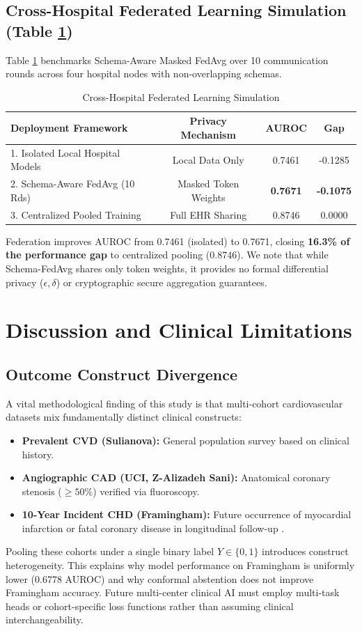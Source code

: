 \documentclass[journal]{IEEEtran}
\begin{document}
\subsection{Cross-Hospital Federated Learning Simulation (Table \ref{tab:federated_learning})}
Table \ref{tab:federated_learning} benchmarks Schema-Aware Masked FedAvg over 10 communication rounds across four hospital nodes with non-overlapping schemas.

\begin{table}[t]
\caption{Cross-Hospital Federated Learning Simulation}
\label{tab:federated_learning}
\centering
\begin{tabular}{lccc}
\toprule
\textbf{Deployment Framework} & \textbf{Privacy Mechanism} & \textbf{AUROC} & \textbf{Gap} \\
\midrule
1. Isolated Local Hospital Models & Local Data Only & 0.7461 & -0.1285 \\
2. Schema-Aware FedAvg (10 Rds)    & Masked Token Weights & \textbf{0.7671} & \textbf{-0.1075} \\
3. Centralized Pooled Training    & Full EHR Sharing & 0.8746 & 0.0000 \\
\bottomrule
\end{tabular}
\end{table}

Federation improves AUROC from 0.7461 (isolated) to 0.7671, closing \textbf{16.3\% of the performance gap} to centralized pooling ($0.8746$). We note that while Schema-FedAvg shares only token weights, it provides no formal differential privacy ($\epsilon, \delta$) or cryptographic secure aggregation guarantees.

\section{Discussion and Clinical Limitations}

\subsection{Outcome Construct Divergence}
A vital methodological finding of this study is that multi-cohort cardiovascular datasets mix fundamentally distinct clinical constructs:
\begin{itemize}
    \item \textbf{Prevalent CVD (Sulianova):} General population survey based on clinical history.
    \item \textbf{Angiographic CAD (UCI, Z-Alizadeh Sani):} Anatomical coronary stenosis ($\ge 50\%$) verified via fluoroscopy.
    \item \textbf{10-Year Incident CHD (Framingham):} Future occurrence of myocardial infarction or fatal coronary disease in longitudinal follow-up \cite{dawber1951}.
\end{itemize}
Pooling these cohorts under a single binary label $Y \in \{0, 1\}$ introduces construct heterogeneity. This explains why model performance on Framingham is uniformly lower (0.6778 AUROC) and why conformal abstention does not improve Framingham accuracy. Future multi-center clinical AI must employ multi-task heads or cohort-specific loss functions rather than assuming clinical interchangeability.
\end{document}
